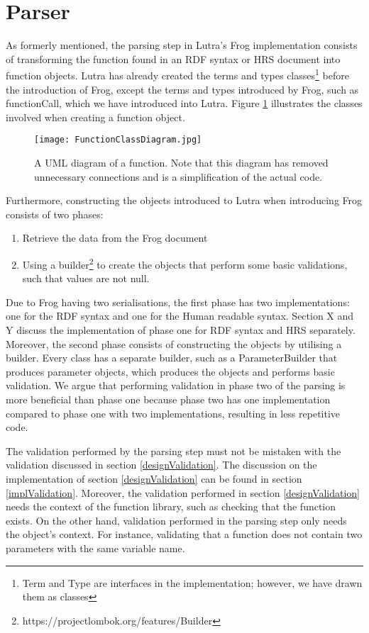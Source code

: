 \section{Parser}
\label{parser}
As formerly mentioned, the parsing step in Lutra's Frog implementation consists of transforming the function found in an RDF syntax or HRS document into function objects. Lutra has already created the terms and types classes\footnote{Term and Type are interfaces in the implementation; however, we have drawn them as classes} before the introduction of Frog, except the terms and types introduced by Frog, such as functionCall, which we have introduced into Lutra. Figure \ref{fig:FunctionClassDiagram} illustrates the classes involved when creating a function object.

\begin{figure}
  \centering
  \texttt{[image: FunctionClassDiagram.jpg]}
  \caption{A UML diagram of a function. Note that this diagram has removed unnecessary connections and is a simplification of the actual code.}
  \label{fig:FunctionClassDiagram}
\end{figure}

\para 
Furthermore, constructing the objects introduced to Lutra when introducing Frog consists of two phases:
\begin{enumerate}
  \item Retrieve the data from the Frog document
  \item Using a builder\footnote{https://projectlombok.org/features/Builder} to create the objects that perform some basic validations, such that values are not null. 
\end{enumerate}
Due to Frog having two serialisations, the first phase has two implementations: one for the RDF syntax and one for the Human readable syntax. Section X and Y discuss the implementation of phase one for RDF syntax and HRS separately. Moreover, the second phase consists of constructing the objects by utilising a builder. Every class has a separate builder, such as a ParameterBuilder that produces parameter objects, which produces the objects and performs basic validation. We argue that performing validation in phase two of the parsing is more beneficial than phase one because phase two has one implementation compared to phase one with two implementations, resulting in less repetitive code. 

\para
The validation performed by the parsing step must not be mistaken with the validation discussed in section \ref{designValidation}. The discussion on the implementation of section \ref{designValidation} can be found in section \ref{implValidation}. Moreover, the validation performed in section \ref{designValidation} needs the context of the function library, such as checking that the function exists. On the other hand, validation performed in the parsing step only needs the object's context. For instance, validating that a function does not contain two parameters with the same variable name. 

